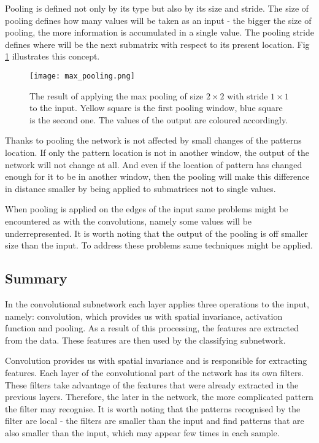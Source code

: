 \documentclass[a4paper,10pt]{report}
\begin{document}
	  Pooling is defined not only by its type but also by its size and stride. The size of pooling defines how many values will be taken as an input - the bigger the size of pooling, the more information is accumulated in a single value. The pooling stride defines where will be the next submatrix with respect to its present location. Fig \ref{fig:max_pooling} illustrates this concept. 
	  
	  \begin{figure}[h!]
	    \centering
	    \texttt{[image: max\_pooling.png]}
	    \caption{The result of applying the max pooling of size $2\times2$ with stride $1\times1$ to the input. Yellow square is the first pooling window, blue square is the second one. The values of the output are coloured accordingly.}
	    \label{fig:max_pooling}
	  \end{figure}
	  
	  Thanks to pooling the network is not affected by small changes of the patterns location. If only the pattern location is not in another window, the output of the network will not change at all. And even if the location of pattern has changed enough for it to be in another window, then the pooling will make this difference in distance smaller by being applied to submatrices not to single values.
  
	  When pooling is applied on the edges of the input same problems might be encountered as with the convolutions, namely some values will be underrepresented. It is worth noting that the output of the pooling is off smaller size than the input. To address these problems same techniques might be applied. 
	  	  
	\subsection{Summary}
	  In the convolutional subnetwork each layer applies three operations to the input, namely: convolution, which provides us with spatial invariance, activation function and pooling. As a result of this processing, the features are extracted from the data. These features are then used by the classifying subnetwork. 
	  
	  Convolution provides us with spatial invariance and is responsible for extracting features. Each layer of the convolutional part of the network has its own filters. These filters take advantage of the features that were already extracted in the previous layers. Therefore, the later in the network, the more complicated pattern the filter may recognise. It is worth noting that the patterns recognised by the filter are local - the filters are smaller than the input and find patterns that are also smaller than the input, which may appear few times in each sample. 
	  
\end{document}
